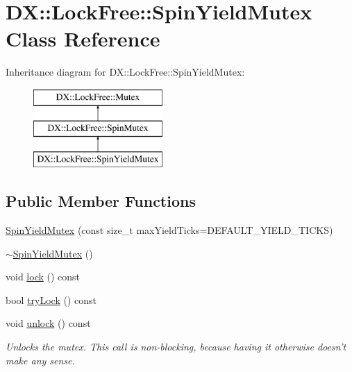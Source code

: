 \hypertarget{class_d_x_1_1_lock_free_1_1_spin_yield_mutex}{\section{D\-X\-:\-:Lock\-Free\-:\-:Spin\-Yield\-Mutex Class Reference}
\label{class_d_x_1_1_lock_free_1_1_spin_yield_mutex}
}
Inheritance diagram for D\-X\-:\-:Lock\-Free\-:\-:Spin\-Yield\-Mutex\-:\begin{figure}[H]
\begin{center}
\leavevmode
\includegraphics[height=3.000000cm]{class_d_x_1_1_lock_free_1_1_spin_yield_mutex}
\end{center}
\end{figure}
\subsection*{Public Member Functions}
\begin{DoxyCompactItemize}
\item 
\hyperlink{class_d_x_1_1_lock_free_1_1_spin_yield_mutex_a3c0996c0b9aab82e247df61a3a9dd38d}{Spin\-Yield\-Mutex} (const size\-\_\-t max\-Yield\-Ticks=D\-E\-F\-A\-U\-L\-T\-\_\-\-Y\-I\-E\-L\-D\-\_\-\-T\-I\-C\-K\-S)
\item 
\hyperlink{class_d_x_1_1_lock_free_1_1_spin_yield_mutex_a12abee65fbb86f2d4e5caf136941be0e}{$\sim$\-Spin\-Yield\-Mutex} ()
\item 
void \hyperlink{class_d_x_1_1_lock_free_1_1_spin_yield_mutex_a4c505e87ee87dbaff9f872a0009fa942}{lock} () const 
\item 
bool \hyperlink{class_d_x_1_1_lock_free_1_1_spin_yield_mutex_a0d8fc55d539af89d8d8e04a61bb5e887}{try\-Lock} () const 
\item 
\hypertarget{class_d_x_1_1_lock_free_1_1_spin_yield_mutex_ad428d031840d4a7679ea101c05095b7c}{void \hyperlink{class_d_x_1_1_lock_free_1_1_spin_yield_mutex_ad428d031840d4a7679ea101c05095b7c}{unlock} () const }\label{class_d_x_1_1_lock_free_1_1_spin_yield_mutex_ad428d031840d4a7679ea101c05095b7c}

\begin{DoxyCompactList}\small\item\em Unlocks the mutex. This call is non-\/blocking, because having it otherwise doesn't make any sense. \end{DoxyCompactList}\end{DoxyCompactItemize}
